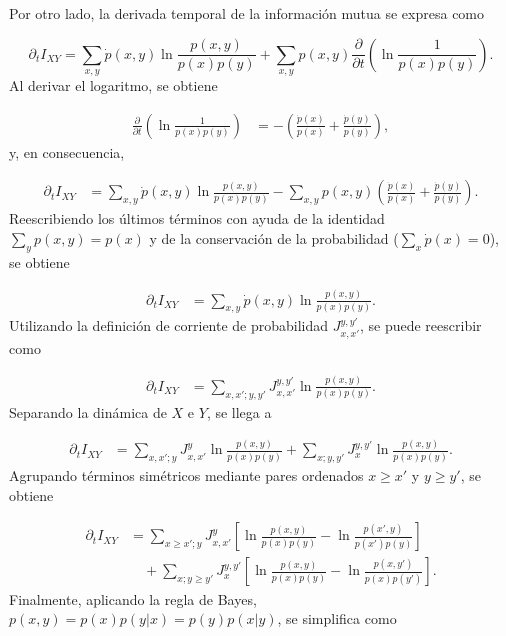 \begin{appendixs}
Por otro lado, la derivada temporal de la información mutua se expresa como

\begin{equation*}
    \partial_{t} I_{XY} = \sum_{x,y} \dot{p}(x,y) \ln \frac{p(x,y)}{p(x)p(y)} 
    + \sum_{x,y} p(x,y) \frac{\partial}{\partial t} \left( \ln \frac{1}{p(x)p(y)} \right).
\end{equation*}
Al derivar el logaritmo, se obtiene

\begin{align*}
    \frac{\partial}{\partial t} \left( \ln \frac{1}{p(x)p(y)} \right) 
    &= - \left( \frac{\dot{p}(x)}{p(x)} + \frac{\dot{p}(y)}{p(y)} \right),
\end{align*}
y, en consecuencia,

\begin{align*}
    \partial_{t} I_{XY} 
    &= \sum_{x,y} \dot{p}(x,y) \ln \frac{p(x,y)}{p(x)p(y)} 
    - \sum_{x,y} p(x,y) \left( \frac{\dot{p}(x)}{p(x)} + \frac{\dot{p}(y)}{p(y)} \right).
\end{align*}
Reescribiendo los últimos términos con ayuda de la identidad \(\sum_{y} p(x,y) = p(x)\) y de la conservación de la probabilidad (\(\sum_{x} \dot{p}(x) = 0\)), se obtiene

\begin{align}
    \partial_{t} I_{XY} 
    &= \sum_{x,y} \dot{p}(x,y) \ln \frac{p(x,y)}{p(x)p(y)}.
\end{align}
Utilizando la definición de corriente de probabilidad \(J_{x,x'}^{y,y'}\), se puede reescribir como

\begin{align}
    \partial_{t} I_{XY} 
    &= \sum_{x,x';y,y'} J_{x,x'}^{y,y'} \ln \frac{p(x,y)}{p(x)p(y)}.
\end{align}
Separando la dinámica de \(X\) e \(Y\), se llega a

\begin{align*}
    \partial_{t} I_{XY} 
    &= \sum_{x,x';y} J_{x,x'}^{y} \ln \frac{p(x,y)}{p(x)p(y)} 
    + \sum_{x;y,y'} J_{x}^{y,y'} \ln \frac{p(x,y)}{p(x)p(y)}.
\end{align*}
Agrupando términos simétricos mediante pares ordenados \(x \geq x'\) y \(y \geq y'\), se obtiene

\begin{align*}
    \partial_{t} I_{XY} 
    &= \sum_{x \geq x';y} J_{x,x'}^{y} \left[ \ln \frac{p(x,y)}{p(x)p(y)} - \ln \frac{p(x',y)}{p(x')p(y)} \right] \\
    &\quad + \sum_{x;y \geq y'} J_{x}^{y,y'} \left[ \ln \frac{p(x,y)}{p(x)p(y)} - \ln \frac{p(x,y')}{p(x)p(y')} \right].
\end{align*}
Finalmente, aplicando la regla de Bayes, \(p(x,y) = p(x)p(y|x) = p(y)p(x|y)\), se simplifica como


\end{appendixs}
